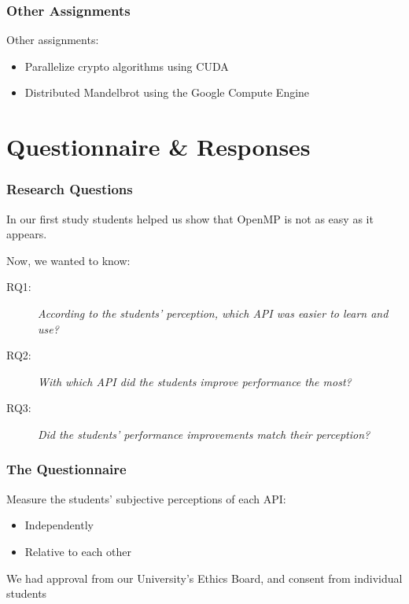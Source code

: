 \documentclass[10pt, compress, aspectratio=169]{beamer}
\begin{document}
\begin{frame}
    \frametitle{Other Assignments}
    Other assignments:

    \begin{itemize}
        \item Parallelize crypto algorithms using CUDA
        \item Distributed Mandelbrot using the Google Compute Engine
    \end{itemize}
\end{frame}

\section{Questionnaire \& Responses}

\begin{frame}
    \frametitle{Research Questions}
    In our first study students helped us show that OpenMP is not as easy as it
    appears.

    Now, we wanted to know:

    \begin{description}
        \item[RQ1:] \textit{According to the students' perception, which API was
            easier to learn and use?}
        \item[RQ2:] \textit{With which API did the students improve performance the
            most?}
        \item[RQ3:] \textit{Did the students' performance improvements match their
            perception?}
    \end{description}
\end{frame}

\begin{frame}
    \frametitle{The Questionnaire}
    Measure the students' subjective perceptions of each API:

    \begin{itemize}
        \item Independently
        \item Relative to each other
    \end{itemize}

    We had approval from our University's Ethics Board, and consent from
    individual students
\end{frame}
\end{document}
